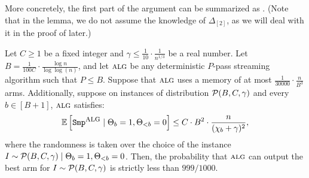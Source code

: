More concretely, the first part of the argument can be summarized as . (Note that in the lemma, we do not assume the knowledge of $\Delta_{[2]}$, as we will deal with it in the proof of  later.)
\begin{lemma}
	\label{lem:hard-B-dist}
	Let $C\geq 1$ be a fixed integer and $\gamma \leq \frac{1}{10}\cdot \frac{1}{n^{1/3}}$ be a real number. Let $B=\frac{1}{100C}\cdot \frac{\log n}{\log\log(n)}$, and let $\mbox{\sc alg}$ be any deterministic $P$-pass streaming algorithm such that $P\leq B$. Suppose that $\mbox{\sc alg}$ uses a memory of at most $\frac{1}{30000}\cdot \frac{n}{B^3}$ arms. 
	Additionally, suppose on instances of distribution $\mathcal{P}(B, C, \gamma)$ and every $b \in [B+1]$, $\mbox{\sc alg}$ satisfies:
	\[
	\operatorname*{{\mathbb{E}}}\left[\mathtt{Smp^{\mbox{\sc alg}}} \mid\Theta_{b}=1, \Theta_{<b}=0\right] \leq C \cdot B^2 \cdot \frac{n}{(\chi_{b}+\gamma)^2}, 
	\]
	where the randomness is taken over the choice of the instance $I \sim \mathcal{P}(B, C, \gamma) \mid \Theta_{b}=1, \Theta_{<b}=0$. %
	Then, the probability that $\mbox{\sc alg}$ can output the best arm for $I \sim \mathcal{P}(B, C, \gamma)$ is strictly less than $999/1000$.  
\end{lemma}
